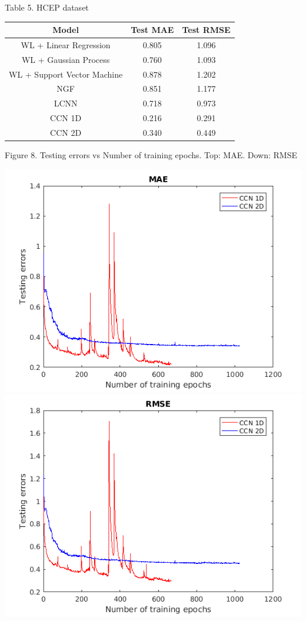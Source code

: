 \documentclass[a4paper]{article}
\begin{document}
\begin{center}
Table 5. HCEP dataset
\begin{tabular}{|| c | c | c ||} 
\hline
Model & Test MAE & Test RMSE \\
\hline
\hline
WL + Linear Regression & 0.805 & 1.096 \\
\hline
WL + Gaussian Process & 0.760 & 1.093 \\ 
\hline
WL + Support Vector Machine & 0.878 & 1.202 \\
\hline
NGF & 0.851 & 1.177 \\
\hline
LCNN & 0.718 & 0.973 \\
\hline 
CCN 1D & {\color{red} 0.216} & {\color{red} 0.291} \\
\hline
CCN 2D & {\color{red} 0.340} & {\color{red} 0.449} \\
\hline
\end{tabular}
\end{center}

\begin{center}
Figure 8. Testing errors vs Number of training epochs. Top: MAE. Down: RMSE
\end{center}
\begin{center}
\includegraphics[scale=0.4]{MAE}
\includegraphics[scale=0.4]{RMSE}
\end{center}
\end{document}

